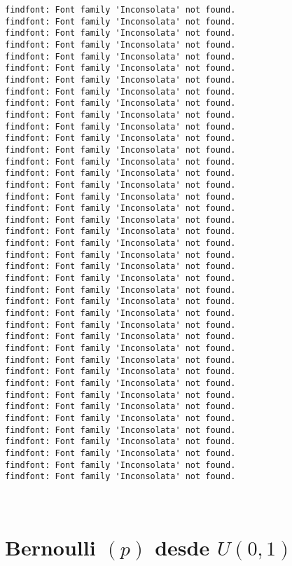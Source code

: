 \documentclass[11pt]{article}
\begin{document}
    \begin{Verbatim}[commandchars=\\\{\}]
findfont: Font family 'Inconsolata' not found.
findfont: Font family 'Inconsolata' not found.
findfont: Font family 'Inconsolata' not found.
findfont: Font family 'Inconsolata' not found.
findfont: Font family 'Inconsolata' not found.
findfont: Font family 'Inconsolata' not found.
findfont: Font family 'Inconsolata' not found.
findfont: Font family 'Inconsolata' not found.
findfont: Font family 'Inconsolata' not found.
findfont: Font family 'Inconsolata' not found.
findfont: Font family 'Inconsolata' not found.
findfont: Font family 'Inconsolata' not found.
findfont: Font family 'Inconsolata' not found.
findfont: Font family 'Inconsolata' not found.
findfont: Font family 'Inconsolata' not found.
findfont: Font family 'Inconsolata' not found.
findfont: Font family 'Inconsolata' not found.
findfont: Font family 'Inconsolata' not found.
findfont: Font family 'Inconsolata' not found.
findfont: Font family 'Inconsolata' not found.
findfont: Font family 'Inconsolata' not found.
findfont: Font family 'Inconsolata' not found.
findfont: Font family 'Inconsolata' not found.
findfont: Font family 'Inconsolata' not found.
findfont: Font family 'Inconsolata' not found.
findfont: Font family 'Inconsolata' not found.
findfont: Font family 'Inconsolata' not found.
findfont: Font family 'Inconsolata' not found.
findfont: Font family 'Inconsolata' not found.
findfont: Font family 'Inconsolata' not found.
findfont: Font family 'Inconsolata' not found.
findfont: Font family 'Inconsolata' not found.
findfont: Font family 'Inconsolata' not found.
findfont: Font family 'Inconsolata' not found.
findfont: Font family 'Inconsolata' not found.
findfont: Font family 'Inconsolata' not found.
findfont: Font family 'Inconsolata' not found.
findfont: Font family 'Inconsolata' not found.
findfont: Font family 'Inconsolata' not found.
findfont: Font family 'Inconsolata' not found.
findfont: Font family 'Inconsolata' not found.
    \end{Verbatim}

    \begin{center}
    \end{center}
    { \hspace*{\fill} \\}
    
    \hypertarget{bernoulli-p-desde-u01}{%
\section{\texorpdfstring{Bernoulli \((p)\) desde
\(U(0,1)\)}{Bernoulli (p) desde U(0,1)}}\label{bernoulli-p-desde-u01}}
\end{document}
